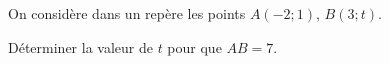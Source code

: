 
On considère dans un repère \Oij les points $A(-2;1)$, $B(3;t)$. 

Déterminer la valeur de $t$ pour que $AB = 7$. 
